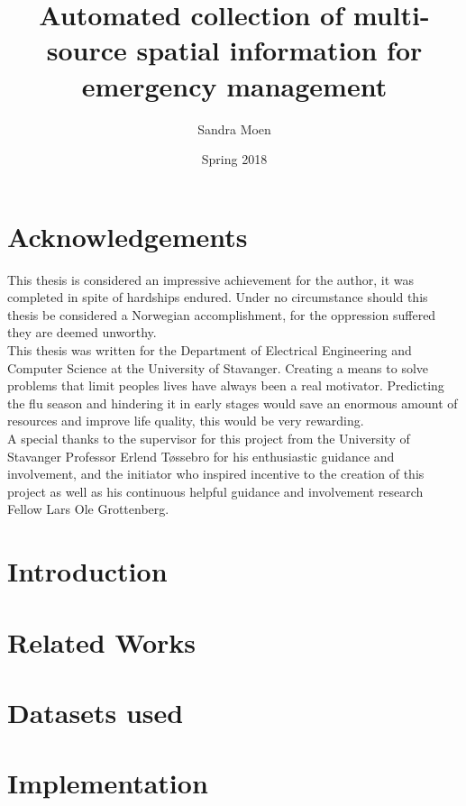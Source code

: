 \documentclass[12pt, twoside]{report}
\title{Automated collection of multi-source spatial information for emergency management}
\author{Sandra Moen}
\date{Spring 2018}
\begin{document}






\chapter*{Acknowledgements}
This thesis is considered an impressive achievement for the author, it was completed in spite of hardships endured. Under no circumstance should this thesis be considered a Norwegian accomplishment, for the oppression suffered they are deemed unworthy.
\newline \\
This thesis was written for the Department of Electrical Engineering and Computer Science at the University of Stavanger. Creating a means to solve problems that limit peoples lives have always been a real motivator. Predicting the flu season and hindering it in early stages would save an enormous amount of resources and improve life quality, this would be very rewarding.\\
A special thanks to the supervisor for this project from the University of Stavanger Professor Erlend Tøssebro for his enthusiastic guidance and involvement, and the initiator who inspired incentive to the creation of this project as well as his continuous helpful guidance and involvement research Fellow Lars Ole Grottenberg.

\setcounter{secnumdepth}{5}
\setcounter{tocdepth}{5}
\tableofcontents
\listoffigures
\listoftables

\chapter{Introduction}


\chapter{Related Works}


\chapter{Datasets used}


\chapter{Implementation}

\end{document}
